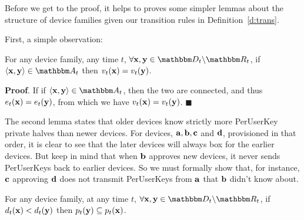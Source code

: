 Before we get to the proof, it helps to proves some simpler lemmas about the structure of device
families given our transition rules in Definition~\ref{d:trans}.

First, a simple observation:

\begin{lemma} 
  For any device family, any time $t$, $\forall \zdev{x},\zdev{y} \in \zactive{t}$, if $\langle
  \zdev{x}, \zdev{y} \rangle \in \zset{a}_t$ then $v_t(\mathbf{x}) = v_t(\mathbf{y})$.
  \label{l:edge}
\end{lemma}

\textbf{Proof}. If if $\langle \zdev{x}, \zdev{y} \rangle \in \zset{a}_t$, then the two are
 connected, and thus $e_t(\mathbf{x}) = e_t(\mathbf{y})$, from which we have $v_t(\mathbf{x})
 = v_t(\mathbf{y})$. $\blacksquare$

The second lemma states that older devices know strictly more PerUserKey private halves than newer
devices. For devices, $\mathbf{a}, \mathbf{b}, \mathbf{c}$ and $\mathbf{d}$, provisioned in that order, it
is clear to see that the later devices will always box for the earlier devices. But keep in mind
that when $\mathbf{b}$ approves new devices, it never sends PerUserKeys back to earlier devices. So we
must formally show that, for instance, $\mathbf{c}$ approving $\mathbf{d}$ does not transmit PerUserKeys
from $\mathbf{a}$ that $\mathbf{b}$ didn't know about.

\begin{lemma}
  For any device family, at any time $t$, $\forall \zdev{x},\zdev{y} \in \zset{d}_t \setsub
  \zset{r}_t$, if $d_t(\mathbf{x}) < d_t(\mathbf{y})$ then $p_t(\mathbf{y}) \subseteq
  p_t(\mathbf{x})$.
  \label{l:puks}
\end{lemma}

